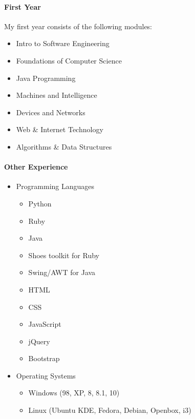 \documentclass{article}
\begin{document}
\paragraph{First Year}
My first year consists of the following modules:
\begin{multicols}{2}
	\begin{itemize}
		\item Intro to Software Engineering
		\item Foundations of Computer Science
		\item Java Programming
		\item Machines and Intelligence
		\item Devices and Networks
		\item Web \& Internet Technology
		\item Algorithms \& Data Structures
	\end{itemize}
\end{multicols}
\paragraph{Other Experience}
\begin{itemize}
	\item Programming Languages
	      \begin{multicols}{2}
		      \begin{itemize}
			      \item Python
			      \item Ruby
			      \item Java
			      \item Shoes toolkit for Ruby
			      \item Swing/AWT for Java
			      \item HTML
			      \item CSS
			      \item JavaScript
			      \item jQuery
			      \item Bootstrap
		      \end{itemize}
	      \end{multicols}
\end{itemize}
\begin{itemize}
	\item Operating Systems
	      \begin{itemize}
		      \item Windows (98, XP, 8, 8.1, 10)
		      \item Linux (Ubuntu KDE, Fedora, Debian, Openbox, i3)
	      \end{itemize}
\end{itemize}
\end{document}
